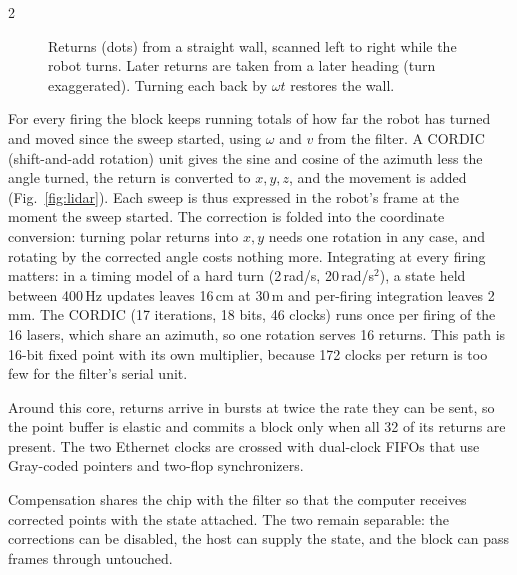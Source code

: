 \documentclass[10pt,letterpaper]{article}
\begin{document}
\begin{multicols}{2}
  \begin{figure}[H]
    \centering
    \caption{Returns (dots) from a straight wall, scanned left to right while the robot turns.
      Later returns are taken from a later heading (turn exaggerated).
    Turning each back by $\omega t$ restores the wall.}
    \label{fig:smear}
  \end{figure}

  For every firing the block keeps running totals of how far the robot has turned and moved since the sweep started, using $\omega$ and $v$ from the filter.
  A CORDIC (shift-and-add rotation) unit gives the sine and cosine of the azimuth less the angle turned, the return is converted to $x,y,z$, and the movement is added (Fig.~\ref{fig:lidar}).
  Each sweep is thus expressed in the robot's frame at the moment the sweep started.
  The correction is folded into the coordinate conversion: turning polar returns into $x,y$ needs one rotation in any case, and rotating by the corrected angle costs nothing more.
  Integrating at every firing matters: in a timing model of a hard turn (2\,rad/s, 20\,rad/s$^2$), a state held between 400\,Hz updates leaves 16\,cm at 30\,m and per-firing integration leaves 2\,mm.
  The CORDIC (17 iterations, 18 bits, 46 clocks) runs once per firing of the 16 lasers, which share an azimuth, so one rotation serves 16 returns.
  This path is 16-bit fixed point with its own multiplier, because 172 clocks per return is too few for the filter's serial unit.

  Around this core, returns arrive in bursts at twice the rate they can be sent, so the point buffer is elastic and commits a block only when all 32 of its returns are present.
  The two Ethernet clocks are crossed with dual-clock FIFOs that use Gray-coded pointers and two-flop synchronizers.

  Compensation shares the chip with the filter so that the computer receives corrected points with the state attached.
  The two remain separable: the corrections can be disabled, the host can supply the state, and the block can pass frames through untouched.

\end{multicols}
\end{document}
